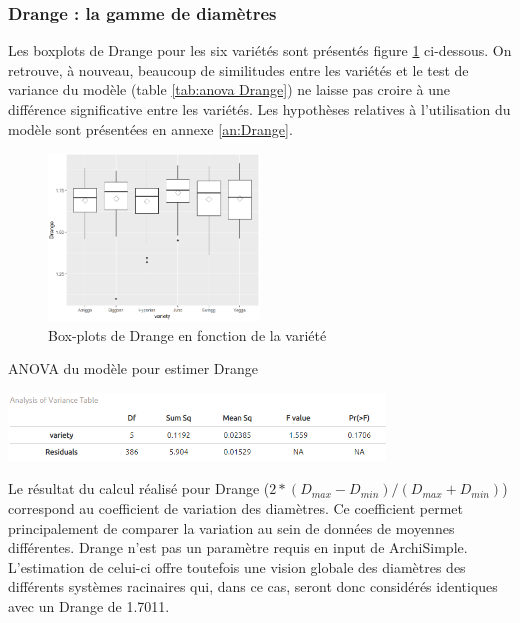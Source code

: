 \subsubsection{Drange : la gamme de diamètres}

Les boxplots de Drange pour les six variétés sont présentés figure \ref{fig:boxplot Drange} ci-dessous.
On retrouve, à nouveau, beaucoup de similitudes entre les variétés et le test de variance du modèle (table \ref{tab:anova Drange}) ne laisse pas croire à une différence significative entre les variétés.
Les hypothèses relatives à l'utilisation du modèle sont présentées en annexe \ref{an:Drange}.

\begin{figure}[ht]
\centering
\includegraphics[width=0.5\textwidth]{Image/boxplot Drange.png}
\caption{Box-plots de Drange en fonction de la variété}
\label{fig:boxplot Drange}
\end{figure}

\begin{table}[ht]
    \centering
    \caption{ANOVA du modèle pour estimer Drange}
    \includegraphics[width=0.75\textwidth]{Image/anova Drange.png}
    \label{tab:anova Drange}
\end{table}

Le résultat du calcul réalisé pour Drange ($2*(D_{max}-D_{min})/(D_{max}+D_{min})$) correspond au coefficient de variation des diamètres.
Ce coefficient permet principalement de comparer la variation au sein de données de moyennes différentes.
Drange n'est pas un paramètre requis en input de ArchiSimple.
L'estimation de celui-ci offre toutefois une vision globale des diamètres des différents systèmes racinaires qui, dans ce cas, seront donc considérés identiques avec un Drange de 1.7011.

